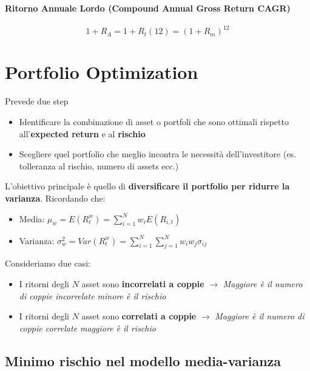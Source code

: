 \documentclass[12pt]{article}
\begin{document}
\paragraph{Ritorno Annuale Lordo (Compound Annual Gross Return CAGR)}
$$1+R_A=1+ R_t(12)=(1+R_m)^{12}$$
\newpage
\section{Portfolio Optimization}
Prevede due step
\begin{itemize}
    \item Identificare la combinazione di asset o portfoli che sono ottimali rispetto all'\textbf{expected return} e al \textbf{rischio}
    \item Scegliere quel portfolio che meglio incontra le necessità dell'investitore (es. tolleranza al rischio, numero di assets ecc.)
\end{itemize}
L'obiettivo principale è quello di \textbf{diversificare il portfolio per ridurre la varianza}. Ricordando che:
\begin{itemize}
    \item Media: $\mu_w=E(R_t^w)=\sum_{i=1}^Nw_iE(R_{i,t})$
    \item Varianza: $\sigma^2_w=Var(R_t^w)=\sum_{i=1}^N\sum_{j=1}^Nw_iw_j\sigma_{ij}$
\end{itemize}
Consideriamo due casi:
\begin{itemize}
    \item I ritorni degli $N$ asset sono \textbf{incorrelati a coppie} $\rightarrow$ \textit{Maggiore è il numero di coppie incorrelate minore è il rischio}
    \item I ritorni degli $N$ asset sono \textbf{correlati a coppie} $\rightarrow$ \textit{Maggiore è il numero di coppie correlate maggiore è il rischio}
\end{itemize}
\subsection{Minimo rischio nel modello media-varianza}
\end{document}
